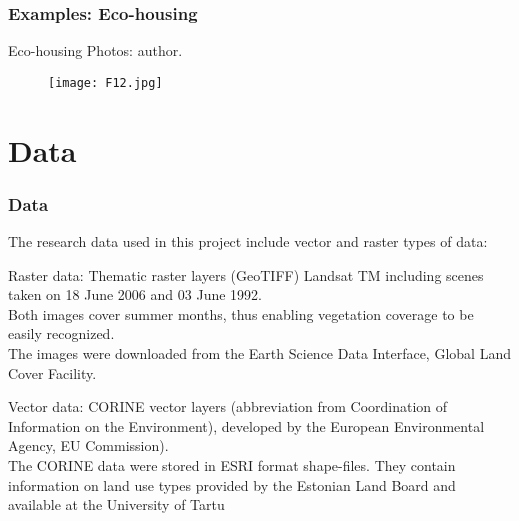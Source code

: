 \documentclass[pdflatex,compress,9pt,
	xcolor={dvipsnames,dvipsnames,svgnames,x11names,table},
	hyperref={colorlinks = true,breaklinks = true, urlcolor = NavyBlue, breaklinks = true}]{beamer}
\begin{document}
\begin{frame}\frametitle{Examples: Eco-housing}
\begin{examples}{Eco-housing}
Photos: author.
\end{examples}
\begin{figure}[H]
	\centering
		\texttt{[image: F12.jpg]}
\end{figure}
\end{frame}

\section{Data}
\begin{frame}\frametitle{Data}
The research data used in this project include vector and raster types of data:

\begin{block}{Raster data:}
Thematic raster layers (GeoTIFF) Landsat TM including scenes taken on \alert{18 June 2006} and \alert{03 June 1992}. \\
Both images cover summer months, thus enabling vegetation coverage to be easily recognized. \\
The images were downloaded from the Earth Science Data Interface, Global Land Cover Facility.
\end{block}

\begin{block}{Vector data:}
\alert{CORINE} vector layers (abbreviation from \alert{Coordination of Information on the Environment}), developed by the European Environmental Agency, EU Commission). \\
The CORINE data were stored in ESRI format shape-files. They contain information on land use types provided by the Estonian Land Board and available at the University of Tartu
\end{block}
\end{frame}
\end{document}
